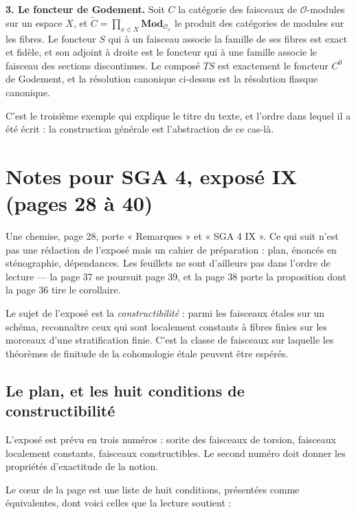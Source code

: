 \documentclass[11pt,a4paper]{article}
\begin{document}
\textbf{3. Le foncteur de Godement.} Soit $C$ la catégorie des faisceaux de
$\mathcal{O}$-modules sur un espace $X$, et $\widetilde{C} = \prod_{x \in X}
\mathbf{Mod}_{\mathcal{O}_{x}}$ le produit des catégories de modules sur les
fibres. Le foncteur $S$ qui à un faisceau associe la famille de ses fibres est
exact et fidèle, et son adjoint à droite est le foncteur qui à une famille
associe le faisceau des sections discontinues. Le composé $TS$ est exactement
le foncteur $C^{0}$ de Godement, et la résolution canonique ci-dessus est la
résolution flasque canonique.

C'est le troisième exemple qui explique le titre du texte, et l'ordre dans
lequel il a été écrit : la construction générale est l'abstraction de ce
cas-là.

\section*{Notes pour SGA 4, exposé IX (pages 28 à 40)}

Une chemise, page 28, porte « Remarques » et « SGA 4 IX ». Ce qui suit n'est
pas une rédaction de l'exposé mais un cahier de préparation : plan, énoncés en
sténographie, dépendances. Les feuillets ne sont d'ailleurs pas dans l'ordre de
lecture — la page 37 se poursuit page 39, et la page 38 porte la proposition
dont la page 36 tire le corollaire.

Le sujet de l'exposé est la \emph{constructibilité} : parmi les faisceaux
étales sur un schéma, reconnaître ceux qui sont localement constants à fibres
finies sur les morceaux d'une stratification finie. C'est la classe de
faisceaux sur laquelle les théorèmes de finitude de la cohomologie étale
peuvent être espérés.

\subsection*{Le plan, et les huit conditions de constructibilité}

L'exposé est prévu en trois numéros : sorite des faisceaux de torsion,
faisceaux localement constants, faisceaux constructibles. Le second numéro doit
donner les propriétés d'exactitude de la notion.

Le cœur de la page est une liste de huit conditions, présentées comme
équivalentes, dont voici celles que la lecture soutient :
\end{document}
